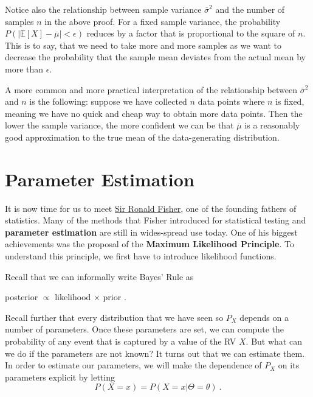 Notice also the relationship between sample variance $ \overline{\sigma}^{2} $ and the number of samples $ n $ in the above proof. For a fixed sample variance, the
probability $ P(|\mathbb{E}[X] - \overline{\mu}| < \epsilon) $ reduces by a factor that is proportional to the square of $ n $. This is to say, that we need to take
more and more samples as we want to decrease the probability that the sample mean deviates from the actual mean by more than $ \epsilon $. 

A more common and more practical interpretation of the relationship between $ \overline{\sigma}^{2} $ and $ n $ is the following: suppose we have collected $ n $ data
points where $ n $ is fixed, meaning we have no quick and cheap way to obtain more data points. Then the lower the sample variance, the more confident we can be
that $ \overline{\mu} $ is a reasonably good approximation to the true mean of the data-generating distribution.


\section{Parameter Estimation}

It is now time for us to meet \href{https://en.wikipedia.org/wiki/Ronald_Fisher}{Sir Ronald Fisher}, 
one of the founding fathers of statistics. Many of the methods that Fisher introduced
for statistical testing and \textbf{parameter estimation} are still in wides-spread use today. One of his biggest achievements was the proposal of the 
\textbf{Maximum Likelihood Principle}. To understand this principle, we first have to introduce likelihood functions.

Recall that we can informally write Bayes' Rule as 
\begin{center}
posterior $ \propto $ likelihood $ \times $ prior .
\end{center}
Recall further that every distribution that we have seen so $ P_{X} $ depends on a number of parameters. Once these parameters are set, we can compute the probability of 
any event that is  captured by a value of the RV $ X $. But what can we do if the parameters are not known? It turns out that we can estimate them. In order to 
estimate our parameters, we will make the dependence of $ P_{X} $ on its parameters explicit by letting
\begin{equation}
P(X=x) = P(X=x|\Theta = \theta) \ . 
\end{equation}

